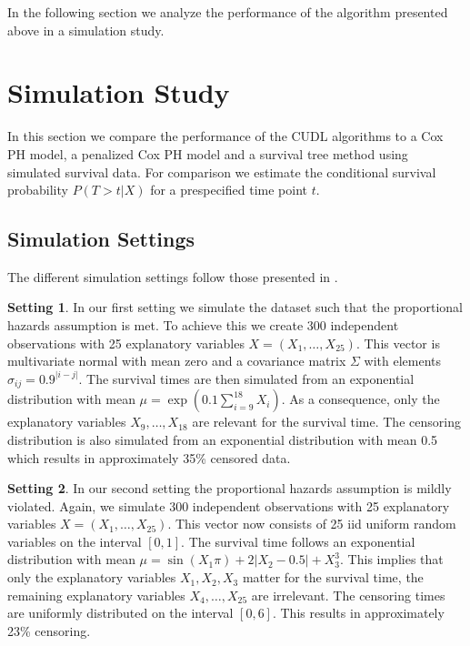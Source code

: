 \documentclass[12pt, a4paper]{scrartcl}
\theoremstyle{definition}
\newtheorem{setting}{Setting}
\theoremstyle{plain}
\numberwithin{equation}{section}
\numberwithin{figure}{section}
\numberwithin{table}{section}
\begin{document}
	In the following section we analyze the performance of the algorithm presented above in a simulation study.
	\newpage

	\section{Simulation Study} \label{simulation}
	In this section we compare the performance of the CUDL algorithms to a Cox PH model, a penalized Cox PH model and a survival tree method using simulated survival data.
	For comparison we estimate the conditional survival probability $P(T>t\vert X)$ for a prespecified time point $t$.
	
	\subsection{Simulation Settings}\label{settings}

	The different simulation settings follow those presented in \citet*{culs}.
	
	\begin{setting}
		In our first setting we simulate the dataset such that the proportional hazards assumption is met.
		To achieve this we create 300 independent observations with 25 explanatory variables $X=(X_1,\dots,X_{25})$.
		This vector is multivariate normal with mean zero and a covariance matrix $\Sigma$ with elements $\sigma_{ij}=0.9^{\vert i-j\vert}$.
		The survival times are then simulated from an exponential distribution with mean $\mu = \exp\left(0.1\sum_{i=9}^{18}X_i\right)$.
		As a consequence, only the explanatory variables $X_9,\dots,X_{18}$ are relevant for the survival time.
		The censoring distribution is also simulated from an exponential distribution with mean 0.5 which results in approximately 35\% censored data.
	\end{setting}

	\begin{setting}		
		In our second setting the proportional hazards assumption is mildly violated.
		Again, we simulate 300 independent observations with 25 explanatory variables $X=(X_1,\dots, X_{25})$.
		This vector now consists of 25 iid uniform random variables on the interval $[0,1]$.
		The survival time follows an exponential distribution with mean $\mu = \sin(X_1\pi)+2\vert X_2-0.5\vert + X_3^3$.
		This implies that only the explanatory variables $X_1,X_2,X_3$ matter for the survival time, the remaining explanatory variables $X_4,\dots,X_{25}$ are irrelevant.
		The censoring times are uniformly distributed on the interval $[0,6]$.
		This results in approximately 23\% censoring.
	\end{setting}
		
\end{document}
